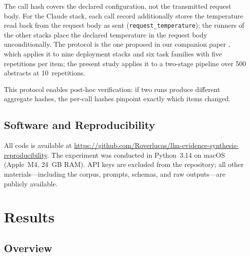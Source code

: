\documentclass[preprint,review,12pt,authoryear]{elsarticle}
\begin{document}
\noindent The call hash covers the declared configuration, not the transmitted request body. For the Claude stack, each call record additionally stores the temperature read back from the request body as sent (\texttt{request\_temperature}); the runners of the other stacks place the declared temperature in the request body unconditionally.
The protocol is the one proposed in our companion paper \citep{rover2026jair}, which applies it to nine deployment stacks and six task families with five repetitions per item; the present study applies it to a two-stage pipeline over 500 abstracts at 10~repetitions.

\noindent This protocol enables post-hoc verification: if two runs produce different aggregate hashes, the per-call hashes pinpoint exactly which items changed.

\subsection{Software and Reproducibility}

All code is available at \url{https://github.com/Roverlucas/llm-evidence-synthesis-reproducibility}.
The experiment was conducted in Python~3.14 on macOS (Apple~M4, 24~GB RAM).
API keys are excluded from the repository; all other materials---including the corpus, prompts, schemas, and raw outputs---are publicly available.


\section{Results}

\subsection{Overview}
\end{document}
